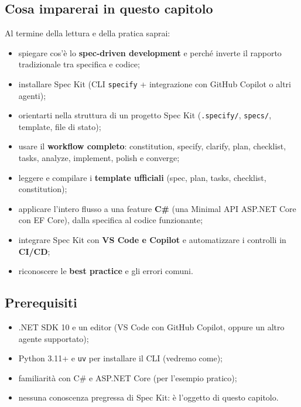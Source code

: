 \documentclass[
  italian,
  10pt,
]{book}
\providecommand{\tightlist}{%
  \setlength{\itemsep}{0pt}\setlength{\parskip}{0pt}}
\begin{document}
\subsection{Cosa imparerai in questo
capitolo}\label{cosa-imparerai-in-questo-capitolo-2}

Al termine della lettura e della pratica saprai:

\begin{itemize}
\tightlist
\item
  spiegare cos'è lo \textbf{spec-driven development} e perché inverte il
  rapporto tradizionale tra specifica e codice;
\item
  installare Spec Kit (CLI \texttt{specify} + integrazione con GitHub
  Copilot o altri agenti);
\item
  orientarti nella struttura di un progetto Spec Kit
  (\texttt{.specify/}, \texttt{specs/}, template, file di stato);
\item
  usare il \textbf{workflow completo}: constitution, specify, clarify,
  plan, checklist, tasks, analyze, implement, polish e converge;
\item
  leggere e compilare i \textbf{template ufficiali} (spec, plan, tasks,
  checklist, constitution);
\item
  applicare l'intero flusso a una feature \textbf{C\#} (una Minimal API
  ASP.NET Core con EF Core), dalla specifica al codice funzionante;
\item
  integrare Spec Kit con \textbf{VS Code e Copilot} e automatizzare i
  controlli in \textbf{CI/CD};
\item
  riconoscere le \textbf{best practice} e gli errori comuni.
\end{itemize}

\subsection{Prerequisiti}\label{prerequisiti-2}

\begin{itemize}
\tightlist
\item
  .NET SDK 10 e un editor (VS Code con GitHub Copilot, oppure un altro
  agente supportato);
\item
  Python 3.11+ e \texttt{uv} per installare il CLI (vedremo come);
\item
  familiarità con C\# e ASP.NET Core (per l'esempio pratico);
\item
  nessuna conoscenza pregressa di Spec Kit: è l'oggetto di questo
  capitolo.
\end{itemize}
\end{document}
